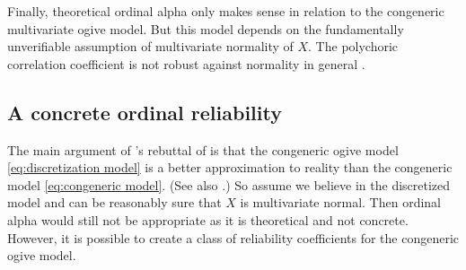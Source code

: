 \documentclass[twoside]{article}
\begin{document}
Finally, theoretical ordinal alpha only makes sense in relation to
the congeneric multivariate ogive model. But this model depends on
the fundamentally unverifiable assumption of multivariate normality
of $X$. The polychoric correlation coefficient is not robust against
normality in general \citep{Foldnes2019-yd}. 

\subsection{A concrete ordinal reliability}

The main argument of \citet{Zumbo2019-lm}'s rebuttal of \citep{Chalmers2018-fj}
is that the congeneric ogive model \eqref{eq:discretization model} 
is a better approximation to reality than the congeneric model \eqref{eq:congeneric model}. (See also \citet[][p.2]{Gadermann2012-jl}.)
So assume we believe in the discretized model and can be reasonably
sure that $X$ is multivariate normal. Then ordinal alpha would still
not be appropriate as it is theoretical and not concrete. However,
it is possible to create a class of reliability coefficients for the
congeneric ogive model.
\end{document}
